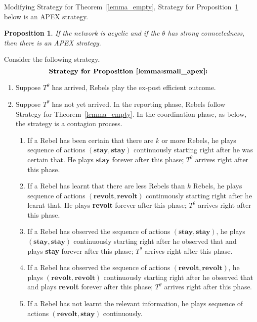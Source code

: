 \documentclass[12pt,letter]{article}
\newtheorem{lemma}{Lemma}[section]
\newtheorem{proposition}{Proposition}[section]
\theoremstyle{definition}
\theoremstyle{definition}
\theoremstyle{remark}
\theoremstyle{claim}
\begin{document}



Modifying Strategy for Theorem~\ref{lemma_empty}, Strategy for Proposition~\ref{lemma:small_apex} below is an APEX strategy.
\begin{proposition}
\label{lemma:small_apex}
If the network is acyclic and if the $\theta$ has strong connectedness, then there is an APEX strategy.
\end{proposition}
Consider the following strategy. 
\[\textbf{Strategy for Proposition~\ref{lemma:small_apex}:}\]
\begin{enumerate}
\item Suppose $T^{\theta}$ has arrived, Rebels play the ex-post efficient outcome. 
\item Suppose $T^{\theta}$ has not yet arrived. In the reporting phase, Rebels follow Strategy for Theorem~\ref{lemma_empty}. In the coordination phase, as below, the strategy is a contagion process. 
\begin{enumerate}
\item If a Rebel has been certain that there are $k$ or more Rebels, he plays sequence of actions $(\textbf{stay},\textbf{stay})$ continuously starting right after he was certain that. He plays \textbf{stay} forever after this phase; $T^{\theta}$ arrives right after this phase.
\item If a Rebel has learnt that there are less Rebels than $k$ Rebels, he plays sequence of actions $(\textbf{revolt},\textbf{revolt})$ continuously starting right after he learnt that. He plays \textbf{revolt} forever after this phase; $T^{\theta}$ arrives right after this phase.
\item If a Rebel has observed the sequence of actions $(\textbf{stay},\textbf{stay})$, he plays $(\textbf{stay},\textbf{stay})$ continuously starting right after he observed that and plays \textbf{stay} forever after this phase; $T^{\theta}$ arrives right after this phase.
\item If a Rebel has observed the sequence of actions $(\textbf{revolt},\textbf{revolt})$, he plays $(\textbf{revolt},\textbf{revolt})$ continuously starting right after he observed that and plays \textbf{revolt} forever after this phase; $T^{\theta}$ arrives right after this phase.
\item If a Rebel has not learnt the relevant information, he plays sequence of actions $(\textbf{revolt},\textbf{stay})$ continuously.
\end{enumerate} 
\end{enumerate}
\end{document}
